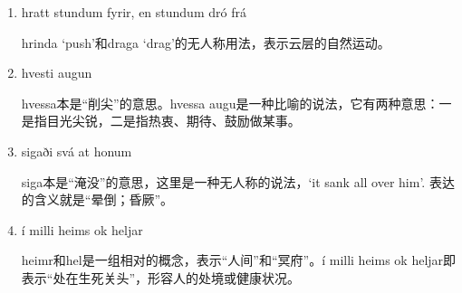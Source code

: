 \begin{grammar*}{}
    \begin{enumerate}[leftmargin=*]
        \item hratt stundum fyrir, en stundum dró frá

              hrinda `push'和draga `drag'的无人称用法，表示云层的自然运动。

        \item hvesti augun

              hvessa本是“削尖”的意思。hvessa augu是一种比喻的说法，它有两种意思：一是指目光尖锐，二是指热衷、期待、鼓励做某事。

        \item sigaði svá at honum

              siga本是“淹没”的意思，这里是一种无人称的说法，`it sank all over him'. 表达的含义就是“晕倒；昏厥”。

        \item í milli heims ok heljar

              heimr和hel是一组相对的概念，表示“人间”和“冥府”。í milli heims ok heljar即表示“处在生死关头”，形容人的处境或健康状况。

    \end{enumerate}
\end{grammar*}

